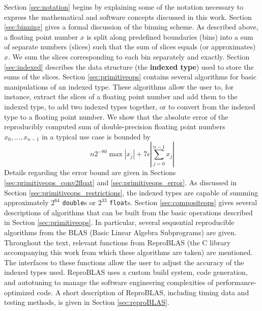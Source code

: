   Section \ref{sec:notation} begins by explaining some of the notation necessary to express the mathematical and software concepts discussed in this work.
  Section \ref{sec:binning} gives a formal discussion of the binning scheme. As described above, a floating point number $x$ is split along predefined boundaries (bins) into a sum of separate numbers (slices) such that the sum of slices equals (or approximates) $x$. We sum the slices corresponding to each bin separately and exactly.
  Section \ref{sec:indexed} describes the data structure (the \textbf{indexed type}) used to store the sums of the slices.
  Section \ref{sec:primitiveops} contains several algorithms for basic manipulations of an indexed type.  These algorithms allow the user to, for instance, extract the slices of a floating point number and add them to the indexed type, to add two indexed types together, or to convert from the indexed type to a floating point number. We show that the absolute error of the reproducibly computed sum of double-precision floating point numbers $x_0, ..., x_{n - 1}$ in a typical use case is bounded by
  \[
    n 2^{-80} \max|x_j| + 7 \epsilon|\sum\limits_{j = 0}^{n - 1} x_j|
  \]
  Details regarding the error bound are given in Sections \ref{sec:primitiveops_conv2float} and \ref{sec:primitiveops_error}.
  As discussed in Section \ref{sec:primitiveops_restrictions}, the indexed types are capable of summing approximately $2^{64}$ \texttt{double}s or $2^{33}$ \texttt{float}s.
  Section \ref{sec:compositeops} gives several descriptions of algorithms that can be built from the basic operations described in Section \ref{sec:primitiveops}. In particular, several sequential reproducible algorithms from the BLAS (Basic Linear Algebra Subprograms) are given.
  Throughout the text, relevant functions from ReproBLAS (the C library accompanying this work from which these algorithms are taken) are mentioned. The interfaces to these functions allow the user to adjust the accuracy of the indexed types used. ReproBLAS uses a custom build system, code generation, and autotuning to manage the software engineering complexities of performance-optimized code. A short description of ReproBLAS, including timing data and testing methods, is given in Section \ref{sec:reproBLAS}.
